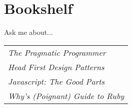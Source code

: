 \documentclass[letterpaper]{deedy-resume} %
\begin{document}
\begin{minipage}[t][10cm]{0.26\textwidth}

\section{Bookshelf}
\small Ask me about...
\normalsize
\begin{tabular}{l}
\textbullet{} \emph{The Pragmatic Programmer} \\
\textbullet{} \emph{Head First Design Patterns} \\
\textbullet{} \emph{Javascript: The Good Parts} \\
\textbullet{} \emph{Why's (Poignant) Guide to Ruby} \\
\end{tabular}

\end{minipage} %
\hfill
%
%
\end{document}
